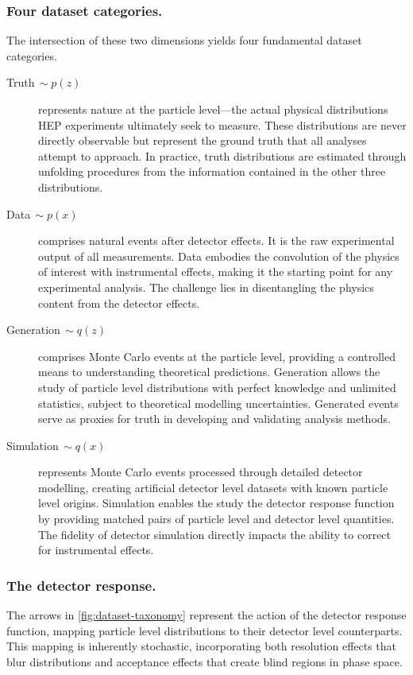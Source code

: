     \subsubsection{Four dataset categories.}
        The intersection of these two dimensions yields four fundamental dataset categories.
        \begin{description}
            \item[Truth\(\,\sim p(z)\)]  represents nature at the particle level---the actual physical distributions HEP experiments ultimately seek to measure.
            These distributions are never directly observable but represent the ground truth that all analyses attempt to approach.
            In practice, truth distributions are estimated through unfolding procedures from the information contained in the other three distributions.
            \item [Data\(\,\sim p(x)\)] comprises natural events after detector effects.
            It is the raw experimental output of all measurements.
            Data embodies the convolution of the physics of interest with instrumental effects, making it the starting point for any experimental analysis.
            The challenge lies in disentangling the physics content from the detector effects.
            \item [Generation\(\,\sim q(z)\)] comprises Monte Carlo events at the particle level, providing a controlled means to understanding theoretical predictions.
            Generation allows the study of particle level distributions with perfect knowledge and unlimited statistics, subject to theoretical modelling uncertainties.
            Generated events serve as proxies for truth in developing and validating analysis methods.
            \item [Simulation\(\,\sim q(x)\)] represents Monte Carlo events processed through detailed detector modelling, creating artificial detector level datasets with known particle level origins.
            Simulation enables the study the detector response function by providing matched pairs of particle level and detector level quantities.
            The fidelity of detector simulation directly impacts the ability to correct for instrumental effects.
        \end{description}
    \subsubsection{The detector response.}
        The arrows in \cref{fig:dataset-taxonomy} represent the action of the detector response function, mapping particle level distributions to their detector level counterparts.
        This mapping is inherently stochastic, incorporating both resolution effects that blur distributions and acceptance effects that create blind regions in phase space.

